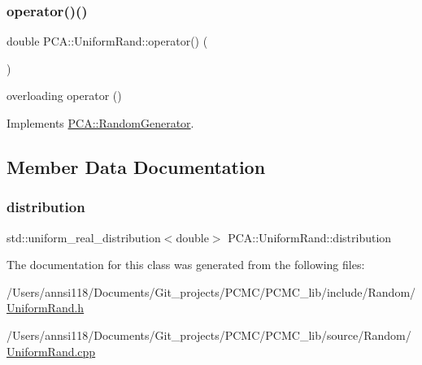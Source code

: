 \subsubsection{\texorpdfstring{operator()()}{operator()()}}
{\footnotesize\ttfamily double P\+C\+A\+::\+Uniform\+Rand\+::operator() (\begin{DoxyParamCaption}{ }\end{DoxyParamCaption})\hspace{0.3cm}{\ttfamily [virtual]}}



overloading operator () 



Implements \hyperlink{class_p_c_a_1_1_random_generator_a4361e39397900ae1e7b2cfa91a592509}{P\+C\+A\+::\+Random\+Generator}.



\subsection{Member Data Documentation}
\hypertarget{class_p_c_a_1_1_uniform_rand_abf0fad6934be0e79ead12a255a324252}{}\label{class_p_c_a_1_1_uniform_rand_abf0fad6934be0e79ead12a255a324252} 
\subsubsection{\texorpdfstring{distribution}{distribution}}
{\footnotesize\ttfamily std\+::uniform\+\_\+real\+\_\+distribution$<$double$>$ P\+C\+A\+::\+Uniform\+Rand\+::distribution\hspace{0.3cm}{\ttfamily [private]}}



The documentation for this class was generated from the following files\+:\begin{DoxyCompactItemize}
\item 
/\+Users/annsi118/\+Documents/\+Git\+\_\+projects/\+P\+C\+M\+C/\+P\+C\+M\+C\+\_\+lib/include/\+Random/\hyperlink{_uniform_rand_8h}{Uniform\+Rand.\+h}\item 
/\+Users/annsi118/\+Documents/\+Git\+\_\+projects/\+P\+C\+M\+C/\+P\+C\+M\+C\+\_\+lib/source/\+Random/\hyperlink{_uniform_rand_8cpp}{Uniform\+Rand.\+cpp}\end{DoxyCompactItemize}
